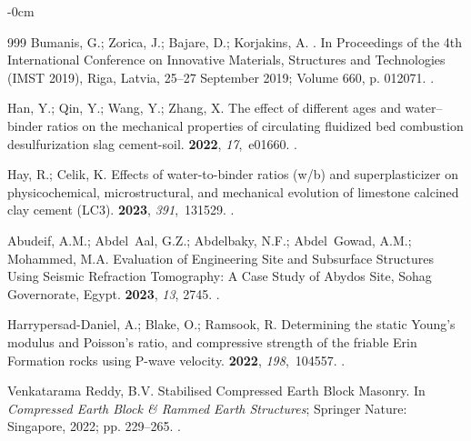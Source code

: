 \documentclass[sustainability,article,accept,pdftex,moreauthors]{Definitions/mdpi}
\begin{document}
{{\begin{adjustwidth}{-\extralength}{0cm}
\begin{thebibliography}{999}
Bumanis, G.; Zorica, J.; Bajare, D.; Korjakins, A.
.\linebreak 
\newblock In Proceedings of the 4th International Conference on Innovative Materials, Structures
  and Technologies (IMST 2019), Riga, Latvia, 25--27 September 2019; Volume 660, p. 012071.
.

Han, Y.; Qin, Y.; Wang, Y.; Zhang, X.
\newblock The effect of different ages and water--binder ratios on the
  mechanical properties of circulating fluidized bed combustion desulfurization
  slag cement-soil.
 {\bf 2022}, {\em
  17},~e01660.
.

Hay, R.; Celik, K.
\newblock Effects of water-to-binder ratios (w/b) and superplasticizer on
  physicochemical, microstructural, and mechanical evolution of limestone
  calcined clay cement (LC3).
 {\bf 2023}, {\em
  391},~131529.
.

Abudeif, A.M.; Abdel~Aal, G.Z.; Abdelbaky, N.F.; Abdel~Gowad, A.M.; Mohammed,
  M.A.
\newblock Evaluation of Engineering Site and Subsurface Structures Using
  Seismic Refraction Tomography: A Case Study of Abydos Site, Sohag
  Governorate, Egypt.
 {\bf 2023}, {\em 13}, {2745.}
.

Harrypersad-Daniel, A.; Blake, O.; Ramsook, R.
\newblock Determining the static Young’s modulus and Poisson’s ratio, and
  compressive strength of the friable Erin Formation rocks using P-wave
  velocity.
 {\bf 2022}, {\em 198},~104557.
.

{Venkatarama Reddy}, B.V. Stabilised Compressed Earth Block Masonry.
\newblock In {\em Compressed Earth Block {\&} Rammed Earth Structures};
  Springer Nature: Singapore, 2022; pp. 229--265.
.


\end{thebibliography}
\end{adjustwidth}}}
\end{document}
